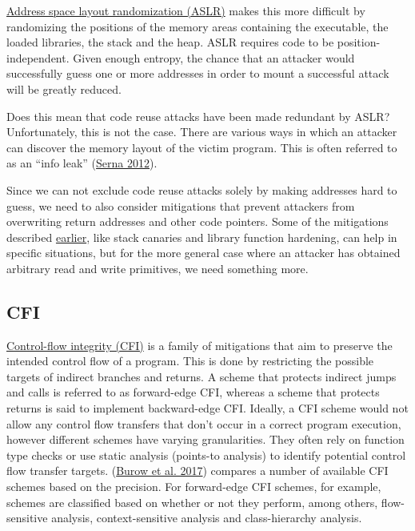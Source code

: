 \documentclass[
  a4paper,
]{report}
\begin{document}
\href{https://en.wikipedia.org/wiki/Address_space_layout_randomization}{Address
space layout randomization (ASLR)} makes this more difficult
by randomizing the positions of the memory areas containing the
executable, the loaded libraries, the stack and the heap. ASLR requires
code to be position-independent. Given enough entropy, the chance that
an attacker would successfully guess one or more addresses in order to
mount a successful attack will be greatly reduced.

Does this mean that code reuse attacks have been made redundant by ASLR?
Unfortunately, this is not the case. There are various ways in which an
attacker can discover the memory layout of the victim program. This is
often referred to as an ``info leak''
(\protect\hyperlink{ref-Serna2012}{Serna 2012}).

Since we can not exclude code reuse attacks solely by making addresses
hard to guess, we need to also consider mitigations that prevent
attackers from overwriting return addresses and other code pointers.
Some of the mitigations described
\protect\hyperlink{stack-buffer-overflows}{earlier}, like stack canaries
and library function hardening, can help in specific situations, but for
the more general case where an attacker has obtained arbitrary read and
write primitives, we need something more.

\hypertarget{cfi}{%
\subsection{CFI}\label{cfi}}

\href{https://en.wikipedia.org/wiki/Control-flow_integrity}{Control-flow
integrity (CFI)} is a family of mitigations that aim to
preserve the intended control flow of a program. This is done by
restricting the possible targets of indirect branches and returns. A
scheme that protects indirect jumps and calls is referred to as
forward-edge CFI, whereas a scheme that protects
returns is said to implement backward-edge CFI.
Ideally, a CFI scheme would not allow any control flow transfers that
don't occur in a correct program execution, however different schemes
have varying granularities. They often rely on function type checks or
use static analysis (points-to analysis) to identify potential control
flow transfer targets. (\protect\hyperlink{ref-Burow2017}{Burow et al.
2017}) compares a number of available CFI schemes based on the
precision. For forward-edge CFI schemes, for example, schemes are
classified based on whether or not they perform, among others,
flow-sensitive analysis, context-sensitive analysis and class-hierarchy
analysis.
\end{document}
